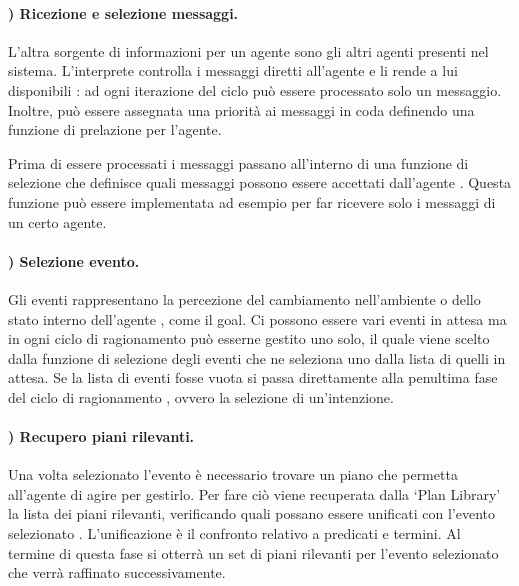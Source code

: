\paragraph{) Ricezione e selezione messaggi.}
L'altra sorgente di informazioni per un agente sono gli altri agenti presenti nel sistema. L'interprete controlla i messaggi diretti all'agente e li rende a lui disponibili \cite{JasonAgentSpeak}: ad ogni iterazione del ciclo può essere processato solo un messaggio. Inoltre, può essere assegnata una priorità ai messaggi in coda definendo una funzione di prelazione per l'agente.

Prima di essere processati i messaggi passano all'interno di una funzione di selezione che definisce quali messaggi possono essere accettati dall'agente \cite{JasonAgentSpeak}. Questa funzione può essere implementata ad esempio per far ricevere solo i messaggi di un certo agente.

\paragraph{) Selezione evento.}
Gli eventi rappresentano la percezione del cambiamento nell'ambiente o dello stato interno dell'agente \cite{JasonAgentSpeak}, come il goal. Ci possono essere vari eventi in attesa ma in ogni ciclo di ragionamento può esserne gestito uno solo, il quale viene scelto dalla funzione di selezione degli eventi che ne seleziona uno dalla lista di quelli in attesa. Se la lista di eventi fosse vuota si passa direttamente alla penultima fase del ciclo di ragionamento \cite{JasonAgentSpeak}, ovvero la selezione di un'intenzione.

\paragraph{) Recupero piani rilevanti.}
Una volta selezionato l'evento è necessario trovare un piano che permetta all'agente di agire per gestirlo. Per fare ciò viene recuperata dalla `Plan Library' la lista dei piani rilevanti, verificando quali possano essere unificati con l'evento selezionato \cite{JasonAgentSpeak}. L'unificazione è il confronto relativo a predicati e termini. Al termine di questa fase si otterrà un set di piani rilevanti per l'evento selezionato che verrà raffinato successivamente.

